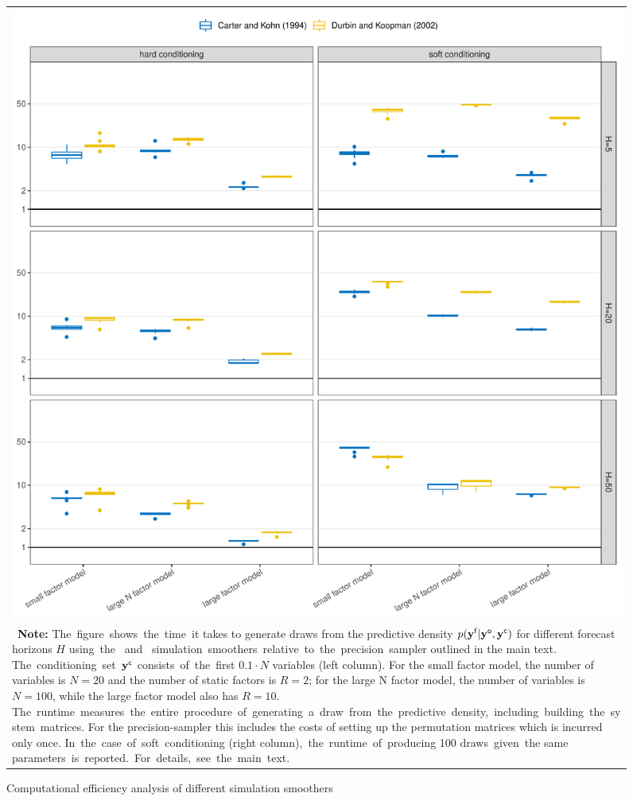 \documentclass[notitlepage,a4paper,12pt]{article}
\begin{document}
\begin{ThreePartTable}
\begin{figure}[htbp] \centering
    \caption{Computational efficiency analysis of different simulation smoothers \label{figsimulation}}
    \footnotesize
    \begin{tabular}{p{16cm}}
    \multicolumn{1}{c}{\includegraphics*[scale = 0.5]{../figures/fig_simulations_Ncond_10.pdf}} \\
    {
    \footnotesize \textbf{Note:} The figure shows the time it takes to generate draws from the predictive density $p(\mathbf{y^{\sf{f}}}|\mathbf{y^{\sf{o}}}, \mathbf{y^{\sf{c}}})$ for different forecast horizons $H$ using the \citet{carterkohn1994_biomtr} and \citet{durbinkoopman2002_biomtr} simulation smoothers relative to the precision sampler outlined in the main text. The conditioning set $\mathbf{y}^{\sf{c}}$ consists of the first $0.1\cdot N$ variables (left column). For the small factor model, the number of variables is $N=20$ and the number of static factors is $R=2$; for the large N factor model, the number of variables is $N=100$, while the large factor model also has $R=10$. The runtime measures the entire procedure of generating a draw from the predictive density, including building the system matrices. For the precision-sampler this includes the costs of setting up the permutation matrices which is incurred only once. In the case of soft conditioning (right column), the runtime of producing 100 draws given the same parameters is reported. For details, see the main text.
    }
    \end{tabular}
    \newline
    \normalsize
\end{figure}


\end{ThreePartTable}
\end{document}
